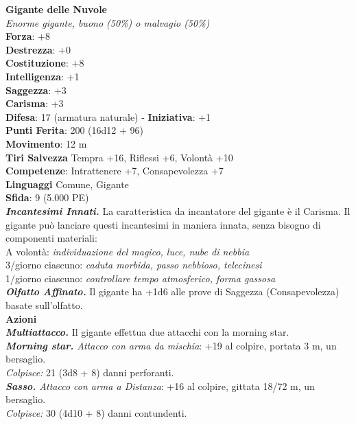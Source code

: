 \begin{multicols}{2}
\medskip\textbf{Gigante delle Nuvole}\\
\emph{Enorme gigante, buono (50\%) o malvagio (50\%)}\\
\textbf{Forza}: +8 \\
\textbf{Destrezza}: +0\\
\textbf{Costituzione}: +8\\
\textbf{Intelligenza}: +1\\
\textbf{Saggezza}: +3\\
\textbf{Carisma}: +3\\
\textbf{Difesa}: 17 (armatura naturale) - \textbf{Iniziativa}: +1\\
\textbf{Punti Ferita}: 200 (16d12 + 96)\\
\textbf{Movimento}: 12 m\\
\textbf{Tiri Salvezza} Tempra +16, Riflessi +6, Volontà +10\\
\textbf{Competenze}: Intrattenere +7, Consapevolezza +7\\
\textbf{Linguaggi} Comune, Gigante\\
\textbf{Sfida}: 9 (5.000 PE)\smallskip\\
\emph{\textbf{Incantesimi Innati.}} La caratteristica da incantatore del gigante è il Carisma. Il gigante può lanciare questi incantesimi in maniera innata, senza bisogno di componenti materiali:\\
A volontà: \emph{individuazione del magico, luce, nube di nebbia}\\
3/giorno ciascuno: \emph{caduta morbida, passo nebbioso, telecinesi}\\
1/giorno ciascuno: \emph{controllare tempo atmosferico, forma gassosa}\\
\emph{\textbf{Olfatto Affinato.}} Il gigante ha +1d6 alle prove di Saggezza (Consapevolezza) basate sull'olfatto.\\
\smallskip\textbf{Azioni}\\
\emph{\textbf{Multiattacco.}} Il gigante effettua due attacchi con la morning star.\\
\emph{\textbf{Morning star.} Attacco con arma da mischia}: +19 al colpire, portata 3 m, un bersaglio.\\
\emph{Colpisce:} 21 (3d8 + 8) danni perforanti.\\
\emph{\textbf{Sasso.} Attacco con arma a Distanza}: +16 al colpire, gittata 18/72 m, un bersaglio.\\
\emph{Colpisce:} 30 (4d10 + 8) danni contundenti.\\

\end{multicols}
